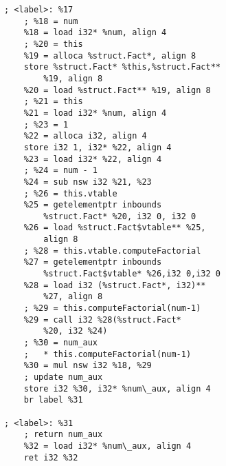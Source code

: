 \begin{verbatim}
; <label>: %17
    ; %18 = num
    %18 = load i32* %num, align 4
    ; %20 = this
    %19 = alloca %struct.Fact*, align 8
    store %struct.Fact* %this,%struct.Fact** 
        %19, align 8
    %20 = load %struct.Fact** %19, align 8
    ; %21 = this
    %21 = load i32* %num, align 4
    ; %23 = 1
    %22 = alloca i32, align 4
    store i32 1, i32* %22, align 4
    %23 = load i32* %22, align 4
    ; %24 = num - 1
    %24 = sub nsw i32 %21, %23
    ; %26 = this.vtable
    %25 = getelementptr inbounds 
        %struct.Fact* %20, i32 0, i32 0
    %26 = load %struct.Fact$vtable** %25, 
        align 8
    ; %28 = this.vtable.computeFactorial
    %27 = getelementptr inbounds 
        %struct.Fact$vtable* %26,i32 0,i32 0
    %28 = load i32 (%struct.Fact*, i32)** 
        %27, align 8
    ; %29 = this.computeFactorial(num-1)
    %29 = call i32 %28(%struct.Fact* 
        %20, i32 %24)
    ; %30 = num_aux 
    ;   * this.computeFactorial(num-1)
    %30 = mul nsw i32 %18, %29
    ; update num_aux
    store i32 %30, i32* %num\_aux, align 4
    br label %31
    
; <label>: %31
    ; return num_aux
    %32 = load i32* %num\_aux, align 4
    ret i32 %32
\end{verbatim}
